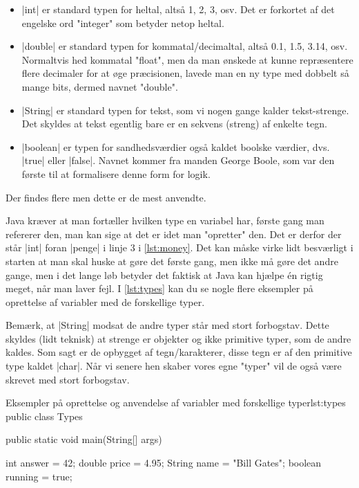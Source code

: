 {\begin{itemize}
	\item \JavaInline|int| er standard typen for heltal, altså 1, 2, 3, osv. Det er forkortet af det engelske ord "integer" som betyder netop heltal.
	\item \JavaInline|double| er standard typen for kommatal/decimaltal, altså 0.1, 1.5, 3.14, osv. Normaltvis hed kommatal "float", men da man ønskede at kunne repræsentere flere decimaler for at øge præcisionen, lavede man en ny type med dobbelt så mange bits, dermed navnet "double".
	\item \JavaInline|String| er standard typen for tekst, som vi nogen gange kalder tekst-strenge. Det skyldes at tekst egentlig bare er en sekvens (streng) af enkelte tegn.
	\item \JavaInline|boolean| er typen for sandhedsværdier også kaldet boolske værdier, dvs. \JavaInline|true| eller \JavaInline|false|. Navnet kommer fra manden George Boole, som var den første til at formalisere denne form for logik.
\end{itemize}

Der findes flere men dette er de mest anvendte.

Java kræver at man fortæller hvilken type en variabel har, første gang man refererer den, man kan sige at det er idet man "opretter" den. Det er derfor der står \JavaInline|int| foran \JavaInline|penge| i linje 3 i \autoref{lst:money}. Det kan måske virke lidt besværligt i starten at man skal huske at gøre det første gang, men ikke må gøre det andre gange, men i det lange løb betyder det faktisk at Java kan hjælpe én rigtig meget, når man laver fejl. I \autoref{lst:types} kan du se nogle flere eksempler på oprettelse af variabler med de forskellige typer.

\begin{remark}
	Bemærk, at \JavaInline|String| modsat de andre typer står med stort forbogstav. Dette skyldes (lidt teknisk) at strenge er objekter og ikke primitive typer, som de andre kaldes. Som sagt er de opbygget af tegn/karakterer, disse tegn er af den primitive type kaldet \JavaInline|char|. Når vi senere hen skaber vores egne "typer" vil de også være skrevet med stort forbogstav.
\end{remark}

\begin{JavaCode}{Eksempler på oprettelse og anvendelse af variabler med forskellige typer}{lst:types}
	public class Types {
		public static void main(String[] args) {
			int answer = 42;
			double price = 4.95;
			String name = "Bill Gates";
			boolean running = true;
			
}}
\end{JavaCode}}
